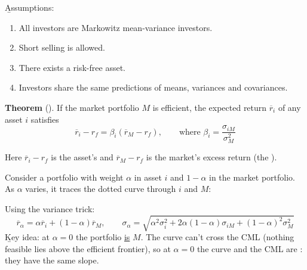 \b{Assumptions}:
\begin{enumerate}[label=(\arabic*)]
    \item All investors are Markowitz mean-variance investors.
    \item Short selling is allowed.
    \item There exists a risk-free asset.
    \item Investors share the same predictions of means, variances and covariances.
\end{enumerate}
\begin{framed}
    \textbf{Theorem} (). If the market portfolio $M$ is efficient, the expected return $\overline{r}_i$ of any asset $i$ satisfies
    \[\boxed{\overline{r}_i - r_f = \beta_i(\overline{r}_M - r_f), \qquad \text{where } \beta_i = \frac{\sigma_{iM}}{\sigma_M^2}}\]
\end{framed}
Here $\overline{r}_i - r_f$ is the asset's  and $\overline{r}_M - r_f$ is the market's excess return (the ).

Consider a portfolio with weight $\alpha$ in asset $i$ and $1-\alpha$ in the market portfolio. As $\alpha$ varies, it traces the dotted curve through $i$ and $M$:
\begin{center}
\end{center}
Using the variance trick:
\[\overline{r}_\alpha = \alpha\overline{r}_i + (1-\alpha)\overline{r}_M, \qquad \sigma_\alpha = \sqrt{\alpha^2\sigma_i^2 + 2\alpha(1-\alpha)\sigma_{iM} + (1-\alpha)^2\sigma_M^2}\]
\b{Key idea}: at $\alpha = 0$ the portfolio \ul{is} $M$. The curve can't cross the CML (nothing feasible lies above the efficient frontier), so at $\alpha = 0$ the curve and the CML are : they have the same slope.

